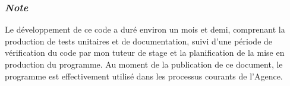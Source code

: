 \vspace{1em}

\subsubsection{\textit{Note}}
Le développement de ce code a duré environ un mois et demi, comprenant la production de tests unitaires et de documentation, suivi d'une période de vérification du code par mon tuteur de stage et la planification de la mise en production du programme. Au moment de la publication de ce document, le programme est effectivement utilisé dans les processus courants de l'Agence.
